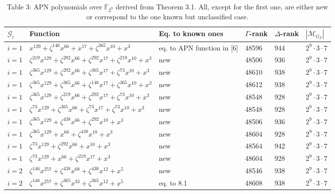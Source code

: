 \documentclass[10pt]{article}
\begin{document}
\begin{table}[h]
\begin{center}
\captionsetup{labelformat=empty}
\caption{Table 3: APN polynomials over $\mathbb{F}_{2^{9}}$ derived from Theorem 3.1. All, except for the first one, are either new or correspond to the one known but unclassified case.}
\begin{tabular}{|l|l|l|l|l|l|}
\hline
$\mathscr{G}_{i}$ & Function & Eq. to known ones & $\Gamma$-rank & $\Delta$-rank & $\left|\mathscr{M}_{G_{F}}\right|$ \\
\hline
$i=1$ & $x^{129}+\zeta^{146} x^{66}+x^{17}+\zeta^{365} x^{10}+x^{3}$ & eq. to APN function in [6] & 48596 & 944 & $2^{9} \cdot 3 \cdot 7$ \\
\hline
$i=1$ & $\zeta^{219} x^{129}+\zeta^{292} x^{66}+\zeta^{292} x^{17}+\zeta^{219} x^{10}+x^{3}$ & new & 48506 & 936 & $2^{9} \cdot 3 \cdot 7$ \\
\hline
$i=1$ & $\zeta^{365} x^{129}+\zeta^{292} x^{66}+\zeta^{365} x^{17}+\zeta^{73} x^{10}+x^{3}$ & new & 48610 & 938 & $2^{9} \cdot 3 \cdot 7$ \\
\hline
$i=1$ & $\zeta^{365} x^{129}+\zeta^{365} x^{66}+\zeta^{146} x^{17}+\zeta^{365} x^{10}+x^{3}$ & new & 48612 & 938 & $2^{9} \cdot 3 \cdot 7$ \\
\hline
$i=1$ & $\zeta^{365} x^{129}+\zeta^{219} x^{66}+\zeta^{292} x^{17}+\zeta^{73} x^{10}+x^{3}$ & new & 48548 & 928 & $2^{9} \cdot 3 \cdot 7$ \\
\hline
$i=1$ & $\zeta^{73} x^{129}+\zeta^{365} x^{66}+\zeta^{73} x^{17}+\zeta^{73} x^{10}+x^{3}$ & new & 48548 & 928 & $2^{9} \cdot 3 \cdot 7$ \\
\hline
$i=1$ & $\zeta^{365} x^{129}+\zeta^{438} x^{66}+\zeta^{292} x^{10}+x^{3}$ & new & 48506 & 936 & $2^{9} \cdot 3 \cdot 7$ \\
\hline
$i=1$ & $\zeta^{365} x^{129}+x^{66}+\zeta^{438} x^{10}+x^{3}$ & new & 48604 & 928 & $2^{9} \cdot 3 \cdot 7$ \\
\hline
$i=1$ & $\zeta^{73} x^{129}+\zeta^{292} x^{66}+x^{10}+x^{3}$ & new & 48564 & 942 & $2^{9} \cdot 3 \cdot 7$ \\
\hline
$i=1$ & $\zeta^{73} x^{129}+x^{66}+\zeta^{219} x^{17}+x^{3}$ & new & 48604 & 928 & $2^{9} \cdot 3 \cdot 7$ \\
\hline
$i=2$ & $\zeta^{146} x^{257}+\zeta^{438} x^{68}+\zeta^{438} x^{12}+x^{5}$ & new & 48546 & 938 & $2^{9} \cdot 3 \cdot 7$ \\
\hline
$i=2$ & $\zeta^{146} x^{257}+\zeta^{365} x^{33}+\zeta^{365} x^{12}+x^{5}$ & eq. to 8.1 & 48608 & 938 & $2^{9} \cdot 3 \cdot 7$ \\

\end{tabular}
\end{center}
\end{table}
\end{document}
